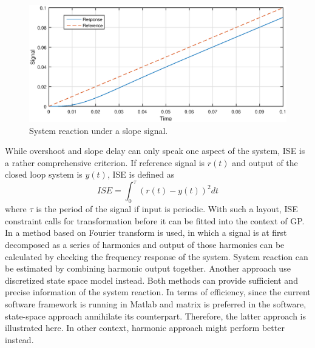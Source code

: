 \begin{figure}[ht]
  \begin{center}
    \includegraphics[width=\linewidth]{Plots/slope_delay1.eps}
  \end{center}
  \caption{System reaction under a slope signal.}
  \label{fig:slope}
\end{figure}

While overshoot and slope delay can only speak one aspect of the system, ISE is a rather comprehensive criterion. If reference signal is $r(t)$ and output of the closed loop system is $y(t)$, ISE is defined as $$ ISE = \int_{0}^{\tau} (r(t)-y(t))^2dt$$ where $\tau$ is the period of the signal if input is periodic. With such a layout, ISE constraint calls for transformation before it can be fitted into the context of GP. In \cite{malmquist2015tool} a method based on Fourier transform is used, in which a signal is at first decomposed as a series of harmonics and output of those harmonics can be calculated by checking the frequency response of the system. System reaction can be estimated by combining harmonic output together. Another approach use discretized state space model instead. Both methods can provide sufficient and precise information of the system reaction. In terms of efficiency, since the current software framework is running in Matlab and matrix is preferred in the software, state-space approach annihilate its counterpart. Therefore, the latter approach is illustrated here. In other context, harmonic approach might perform better instead.

